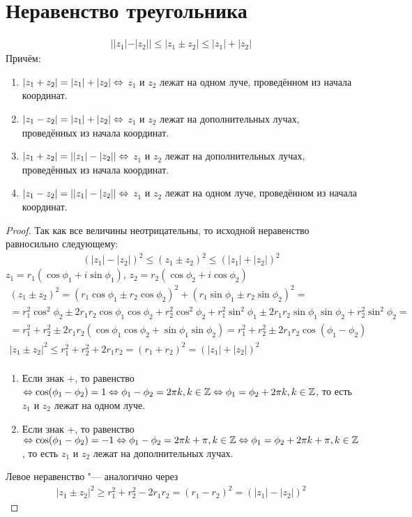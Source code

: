 \section{Неравенство треугольника}

\begin{theorem}{} 
\begin{gather*}
||z_1| - |z_2|| \leqslant |z_1 \pm z_2| \leqslant |z_1| + |z_2|
\end{gather*}
Причём:
\begin{enumerate}
	\item $|z_1 + z_2| = |z_1| + |z_2| \Leftrightarrow$ $z_1$ и $z_2$ лежат на одном луче, проведённом из начала координат.
	\item $|z_1 - z_2| = |z_1| + |z_2| \Leftrightarrow$ $z_1$ и $z_2$ лежат на дополнительных лучах, проведённых из начала координат.
	\item $|z_1 + z_2| = ||z_1| - |z_2|| \Leftrightarrow$ $z_1$ и $z_2$ лежат на дополнительных лучах, проведённых из начала координат.
	\item $|z_1 - z_2| = ||z_1| - |z_2|| \Leftrightarrow$ $z_1$ и $z_2$ лежат на одном луче, проведённом из начала координат.
\end{enumerate} 
\end{theorem}
\begin{proof}
Так как все величины неотрицательны, то исходной неравенство равносильно следующему:
\begin{gather*}
(|z_1|-|z_2|)^2 \leqslant (z_1 \pm z_2)^2 \leqslant (|z_1| + |z_2|)^2
\end{gather*}
$z_1 = r_1(\cos \phi_1 + i \sin \phi_1)$, $z_2 = r_2(\cos \phi_2 + i \cos \phi_2)$
\begin{gather*}
(z_1 \pm z_2)^2 = (r_1 \cos \phi_1 \pm r_2 \cos \phi_2)^2 + (r_1 \sin \phi_1 \pm r_2 \sin \phi_2)^2 = \\
= r_1^2 \cos^2 \phi_2 \pm 2r_1r_2 \cos \phi_1 \cos \phi_2 + r_2^2 \cos^2 \phi_2 + r_1^2 \sin^2 \phi_1 \pm 2r_1r_2 \sin \phi_1 \sin \phi_2 + r_2^2 \sin^2 \phi_2 = \\
= r_1^2 + r_2 ^2 \pm 2r_1r_2(\cos \phi_1 \cos \phi_2 + \sin \phi_1 \sin \phi_2) = r_1^2 + r_2^2 \pm 2r_1r_2 \cos(\phi_1 - \phi_2) \\
|z_1 \pm z_2|^2 \leqslant r_1^2 + r_2^2 + 2r_1r_2 = (r_1 + r_2)^2 = (|z_1| + |z_2|)^2 \\
\end{gather*}
\begin{enumerate}
	\item Если знак +, то равенство $\Leftrightarrow \cos(\phi_1 - \phi_2) = 1 \Leftrightarrow \phi_1 - \phi_2 = 2 \pi k, k \in \mathbb{Z} \Leftrightarrow \phi_1 = \phi_2 + 2 \pi k, k \in \mathbb{Z}$, то есть $z_1$ и $z_2$ лежат на одном луче.
	\item Если знак +, то равенство $\Leftrightarrow \cos(\phi_1 - \phi_2) = -1 \Leftrightarrow \phi_1 - \phi_2 = 2 \pi k + \pi, k \in \mathbb{Z} \Leftrightarrow \phi_1 = \phi_2 + 2 \pi k + \pi, k \in \mathbb{Z}$, то есть $z_1$ и $z_2$ лежат на дополнительных лучах.
\end{enumerate}
Левое неравенство "--- аналогично через
\begin{gather*}
|z_1 \pm z_2|^2 \geqslant r_1^2 + r_2^2 - 2r_1r_2 = (r_1 - r_2)^2 = (|z_1| - |z_2|)^2
\end{gather*}
\end{proof}